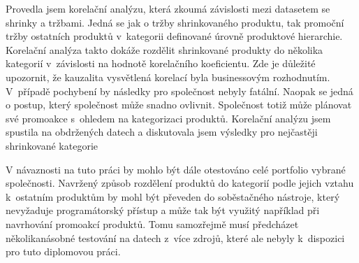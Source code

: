 Provedla jsem korelační analýzu, která zkoumá závislosti mezi datasetem se shrinky a tržbami. Jedná se jak o tržby shrinkovaného produktu, tak promoční tržby ostatních produktů v~kategorii definované úrovně produktové hierarchie. Korelační analýza takto dokáže rozdělit shrinkované produkty do několika kategorií v~závislosti na hodnotě korelačního koeficientu. Zde je důležité upozornit, že kauzalita vysvětlená korelací byla businessovým rozhodnutím. V~případě pochybení by následky pro společnost nebyly fatální. Naopak se jedná o postup, který společnost může snadno ovlivnit.   Společnost totiž může plánovat své promoakce s~ohledem na kategorizaci produktů. 
Korelační analýzu jsem spustila na obdržených datech a diskutovala jsem výsledky pro nejčastěji shrinkované kategorie  

V návaznosti na tuto práci by mohlo být dále otestováno celé portfolio vybrané společnosti.
Navržený způsob rozdělení produktů do kategorií podle jejich vztahu k~ostatním produktům by mohl být převeden do soběstačného nástroje, který nevyžaduje programátorský přístup a může tak být využitý například při navrhování promoakcí produktů. Tomu samozřejmě musí předcházet několikanásobné testování na datech z~více zdrojů, které ale nebyly k~dispozici pro tuto diplomovou práci.


